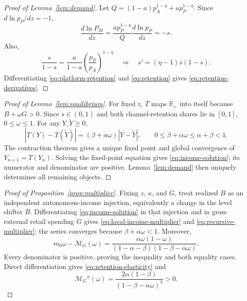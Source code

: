 \begin{proof}[Proof of Lemma~\ref{lem:demand}]
Let \(Q=(1-a)p_A^{1-\eta}+ap_P^{1-\eta}\). Since
\(d\ln p_P/dz=-1\),
\begin{equation}
 \frac{d\ln P_M}{dz}
 =\frac{ap_P^{1-\eta}}{Q}\frac{d\ln p_P}{dz}=-s.
 \label{eq:price-derivative-proof}
\end{equation}
Also,
\begin{equation}
 \frac{s}{1-s}=\frac{a}{1-a}
 \left(\frac{p_P}{p_A}\right)^{1-\eta}
 \quad\Longrightarrow\quad
 s'=(\eta-1)s(1-s).
 \label{eq:share-derivative-proof}
\end{equation}
Differentiating \eqref{eq:platform-retention} and \eqref{eq:retention} gives
\eqref{eq:retention-derivatives}.
\end{proof}

\begin{proof}[Proof of Lemma~\ref{lem:equilibrium}]
For fixed \(z\), \(T\) maps \(\mathbb R_+\) into itself because
\(B+\omega G>0\). Since \(s\in(0,1)\) and both channel-retention shares lie in
\([0,1]\), \(0\leq\omega\leq1\). For any \(Y,\widetilde Y\geq0\),
\begin{equation}
 |T(Y)-T(\widetilde Y)|
 =(\beta+\alpha\omega)|Y-\widetilde Y|,
 \qquad 0\leq\beta+\alpha\omega\leq\alpha+\beta<1.
 \label{eq:contraction-proof}
\end{equation}
The contraction theorem gives a unique fixed point and global convergence of
\(Y_{n+1}=T(Y_n)\). Solving the fixed-point equation gives
\eqref{eq:income-solution}; its numerator and denominator are positive.
Lemma~\ref{lem:demand} then uniquely determines all remaining objects.
\end{proof}

\begin{proof}[Proof of Proposition~\ref{prop:multiplier}]
Fixing \(z\), \(\kappa\), and \(G\), treat realized \(B\) as an independent
autonomous-income injection, equivalently a change in the level shifter
\(\bar B\). Differentiating \eqref{eq:income-solution} in that injection and in
gross external retail spending \(G\) gives
\eqref{eq:local-income-multiplier} and \eqref{eq:recursive-multiplier}; the
series converges because
\(\beta+\alpha\omega<1\). Moreover,
\begin{equation}
 m_0\omega-\mathcal M_G(\omega)=
 \frac{\alpha\omega(1-\omega)}
 {(1-\alpha-\beta)(1-\beta-\alpha\omega)}.
 \label{eq:multiplier-gap}
\end{equation}
Every denominator is positive, proving the inequality and both equality cases.
Direct differentiation gives \eqref{eq:retention-elasticity} and
\begin{equation}
 \mathcal M_G''(\omega)=
 \frac{2\alpha(1-\beta)}
 {(1-\beta-\alpha\omega)^3}>0.
 \label{eq:multiplier-convexity}
\end{equation}
\end{proof}

